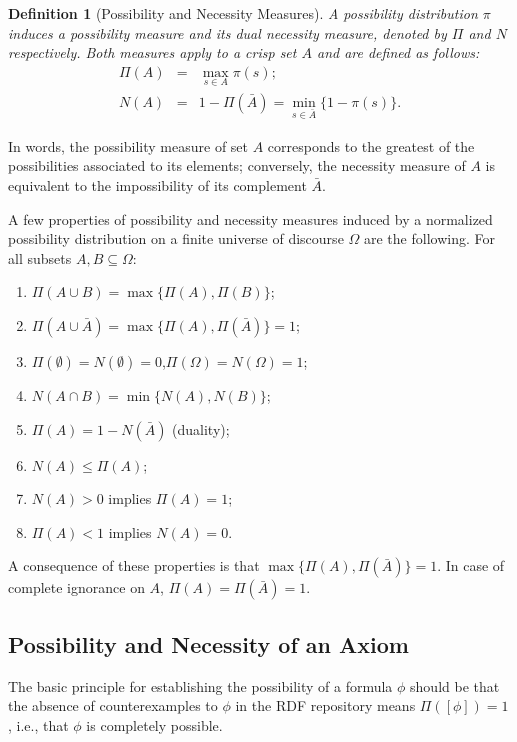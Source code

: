 \documentclass[a4paper]{article}
\newtheorem{definition}{Definition}
\newcounter{ex}
\begin{document}
\begin{definition}[Possibility and Necessity Measures] %
A possibility distribution $\pi$ induces a \emph{possibility
measure} and its dual \emph{necessity
measure}, denoted by $\Pi$ and $N$
respectively. Both measures apply to a crisp set $A$ and are
defined as follows:
\begin{eqnarray}
  \Pi(A) &=& \max_{s\in A} \pi(s); \\
  N(A)   &=& 1 - \Pi(\bar{A}) = \min_{s\in \bar{A}} \{1 - \pi(s)\}.
\end{eqnarray}
\end{definition}

In words, the possibility measure of set $A$ corresponds to the
greatest of the possibilities associated to its elements; conversely,
the necessity measure of $A$ is equivalent to the impossibility of
its complement $\bar{A}$.

A few properties of possibility and necessity measures 
induced by a normalized possibility distribution on a finite universe of
discourse $\Omega$ are the following. For all subsets $A, B\subseteq \Omega$:
\begin{enumerate}
  \item $\Pi(A \cup B) = \max\{\Pi(A), \Pi(B)\}$;
  \item $\Pi(A \cup \bar A) = \max\{\Pi(A), \Pi(\bar A)\}=1$;
  \item $\Pi(\emptyset) = N(\emptyset) = 0$,\quad $\Pi(\Omega) = N(\Omega) = 1$;
  \item $N(A \cap B) = \min\{N(A), N(B)\}$;
  \item $\Pi(A) = 1 - N(\bar{A})$ (duality);
  \item $N(A) \leq \Pi(A)$;
  \item $N(A) > 0$ implies $\Pi(A) = 1$;
  \item $\Pi(A) < 1$ implies $N(A) = 0$.
\end{enumerate}
A consequence of these properties is that $\max\{\Pi(A), \Pi(\bar{A})\} = 1$.
In case of complete ignorance on $A$, $\Pi(A) = \Pi(\bar{A}) = 1$.

\subsection{Possibility and Necessity of an Axiom}

The basic principle for establishing the possibility of a formula $\phi$ should be
that the absence of counterexamples to $\phi$ in the RDF repository means $\Pi([\phi]) = 1$,
i.e., that $\phi$ is completely possible.
\end{document}
